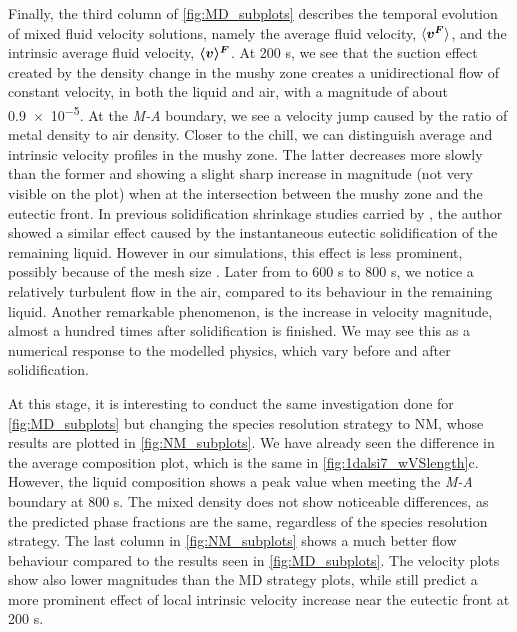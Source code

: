 Finally, the third column of \cref{fig:MD_subplots} describes the temporal evolution of mixed fluid velocity solutions, namely the average fluid velocity, $\langle \boldsymbol{v^F} \rangle$,
and the intrinsic average fluid velocity, $\boldsymbol{\langle v \rangle^F}$. At 200 s, we see that the suction effect created by the density change in the mushy zone creates a
unidirectional flow of constant velocity, in both the liquid and air, with a magnitude of about \SI{0.9e-5}{\uvelocity}. At the \emph{M-A} boundary, we see a velocity
jump caused by the ratio of metal density to air density. Closer to the chill, we can distinguish average and intrinsic velocity profiles in the mushy zone. The latter decreases
more slowly than the former and showing a slight sharp increase in magnitude (not very visible on the plot) when at the intersection between the mushy zone and the eutectic front.
In previous solidification shrinkage studies carried by \citet{niane_etude_2004}, the author showed a similar effect caused by the instantaneous eutectic solidification of the remaining
liquid. However in our simulations, this effect is less prominent, possibly because of the mesh size 	. 
Later from to 600 s to 800 s, we notice a relatively turbulent flow in the air, compared to its behaviour in the remaining liquid. Another remarkable phenomenon, is the 
increase in velocity magnitude, almost a hundred times after solidification is finished. We may see this as a numerical response to the modelled physics, which vary
before and after solidification.  

At this stage, it is interesting to conduct the same investigation done for \cref{fig:MD_subplots} 
but changing the species resolution strategy to NM, whose results are plotted
in \cref{fig:NM_subplots}. We have already seen the difference in the average composition plot, which is the same in \cref{fig:1dalsi7_wVSlength}c.	However, the liquid composition shows a peak value when meeting the \emph{M-A} boundary at 800 s. 
The mixed density does not show noticeable differences, as the predicted phase fractions are the same, regardless of the species resolution strategy. 
The last column in \cref{fig:NM_subplots} shows a much better flow behaviour compared to the results seen in \cref{fig:MD_subplots}.
The velocity plots show also lower magnitudes than the MD strategy plots, while still predict a more prominent effect of 
local intrinsic velocity increase near the eutectic front at 200 s.


